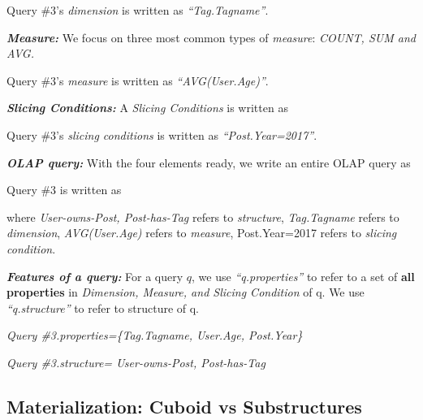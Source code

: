 Query \#3's \textit{dimension} is written as \textit{``Tag.Tagname''}.

\textbf{\textit{Measure:}} We focus on three most common types of \textit{measure}: \textit{COUNT, SUM and AVG. }

Query \#3's \textit{measure} is written as \textit{``AVG(User.Age)''}.


\textbf{\textit{Slicing Conditions:}} A \textit{Slicing Conditions} is written as 


Query \#3's \textit{slicing conditions} is written as \textit{``Post.Year=2017''}.

\textbf{\textit{OLAP query:}} With the four elements ready, we write an entire OLAP query as 


Query \#3 is written as 


where \textit{User-owns-Post, Post-has-Tag} refers to  \textit{structure}, \textit{Tag.Tagname} refers to \textit{dimension},\textit{ AVG(User.Age) } refers to \textit{measure}, {Post.Year=2017} refers to \textit{slicing condition}. 



\textbf{\textit{Features of a query:}} For a query $q$, we use \textit{``q.properties''} to refer to a set of \textbf{all properties} in \textit{Dimension, Measure, and Slicing Condition} of q. We use \textit{``q.structure''} to refer to structure of q.

\textit{Query \#3.properties=\{Tag.Tagname, User.Age, Post.Year\}}

\textit{Query \#3.structure= User-owns-Post, Post-has-Tag}



\subsection{Materialization: Cuboid vs Substructures}
\label{Materialization: Cuboid vs Substructures}



